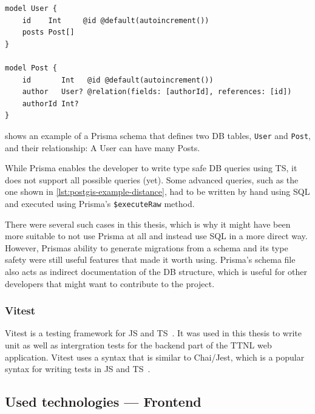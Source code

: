 \begin{lstlisting}[float, caption={Example of a Prisma schema}, label={lst:prisma-schema-example}]
model User {
    id    Int     @id @default(autoincrement())
    posts Post[]
}
    
model Post {
    id       Int   @id @default(autoincrement())
    author   User? @relation(fields: [authorId], references: [id])
    authorId Int?
}
\end{lstlisting}

 shows an example of a Prisma schema that defines two \ac{DB} tables, \lstinline{User} and \lstinline{Post}, and their relationship: A User can have many Posts.

While Prisma enables the developer to write type safe \ac{DB} queries using \ac{TS}, it does not support all possible queries (yet).
Some advanced queries, such as the one shown in \cref{lst:postgis-example-distance}, had to be written by hand using \ac{SQL} and executed using Prisma's \lstinline|$executeRaw| method.

There were several such cases in this thesis, which is why it might have been more suitable to not use Prisma at all and instead use \ac{SQL} in a more direct way.
However, Prismas ability to generate migrations from a schema and its type safety were still useful features that made it worth using.
Prisma's schema file also acts as indirect documentation of the \ac{DB} structure, which is useful for other developers that might want to contribute to the project.


\subsubsection{Vitest}

Vitest is a testing framework for \ac{JS} and \ac{TS}~\cite{vitest_team_vitest_2023}.
It was used in this thesis to write unit as well as intergration tests for the backend part of the \ac{TTNL} web application.
Vitest uses a syntax that is similar to Chai/Jest, which is a popular syntax for writing tests in \ac{JS} and \ac{TS}~\cite{vitest_team_vitest_2023-1}.

\subsection{Used technologies --- Frontend}

